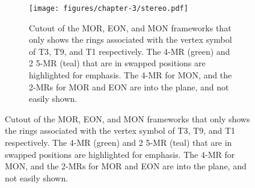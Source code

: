 \documentclass[preprint,numrefs,noinfo,sort&compress]{elsarticle}
\begin{document}
\begin{figure}
\begin{figure}[H]
\centering
\texttt{[image: figures/chapter-3/stereo.pdf]}
\caption{Cutout of the MOR, EON, and MON frameworks that only shows the rings associated with the vertex symbol of T3, T9, and T1 respectively. The 4-MR (green) and 2\texttimes{} 5-MR (teal) that are in swapped positions are highlighted for emphasis. The 4-MR for MON, and the 2-MRs for MOR and EON are into the plane, and not easily shown. \label{fig:stereo}}
\end{figure}
\end{figure}

\end{document}
